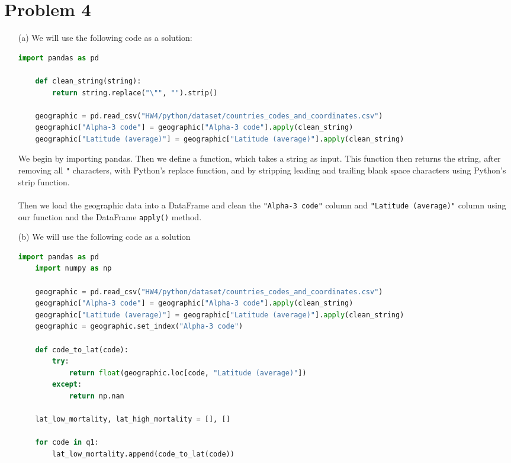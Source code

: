 \documentclass[12pt, letterpaper]{article}
\begin{document}
\newpage
\noindent\makebox[\linewidth]{\rule{18cm}{0.4pt}}
\section*{Problem 4}
\begin{enumerate}
    \item [(a)] We will use the following code as a solution:
\begin{lstlisting}[language=python]
    import pandas as pd

    def clean_string(string):
        return string.replace("\"", "").strip()

    geographic = pd.read_csv("HW4/python/dataset/countries_codes_and_coordinates.csv")
    geographic["Alpha-3 code"] = geographic["Alpha-3 code"].apply(clean_string)
    geographic["Latitude (average)"] = geographic["Latitude (average)"].apply(clean_string)
\end{lstlisting}
    We begin by importing pandas. Then we define a function, which takes a string as input. 
    This function then returns the string, after removing all \texttt{"} characters, with 
    Python's replace function, and by stripping leading and trailing blank space 
    characters using Python's strip function. \\ \\
    Then we load the geographic data into a DataFrame and clean the \texttt{"Alpha-3 code"} column and 
    \texttt{"Latitude (average)"} column using our function and the DataFrame \texttt{apply()} method.
    \newpage
    \item [(b)] We will use the following code as a solution 
\begin{lstlisting}[language=python]
    import pandas as pd
    import numpy as np

    geographic = pd.read_csv("HW4/python/dataset/countries_codes_and_coordinates.csv")
    geographic["Alpha-3 code"] = geographic["Alpha-3 code"].apply(clean_string)
    geographic["Latitude (average)"] = geographic["Latitude (average)"].apply(clean_string)
    geographic = geographic.set_index("Alpha-3 code")

    def code_to_lat(code):
        try:
            return float(geographic.loc[code, "Latitude (average)"])
        except:
            return np.nan

    lat_low_mortality, lat_high_mortality = [], []

    for code in q1:
        lat_low_mortality.append(code_to_lat(code))


\end{lstlisting}
\end{enumerate}
\end{document}
